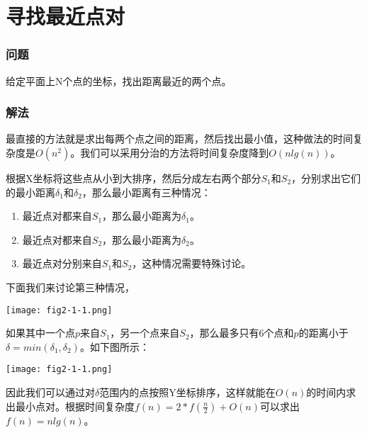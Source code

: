 \section{寻找最近点对} %
\label{sec:closest-pair-of-points}

\subsubsection{问题}
给定平面上N个点的坐标，找出距离最近的两个点。

\subsubsection{解法}
最直接的方法就是求出每两个点之间的距离，然后找出最小值，这种做法的时间复杂度是$O(n^2)$。我们可以采用分治的方法将时间复杂度降到$O(nlg(n))$。

根据X坐标将这些点从小到大排序，然后分成左右两个部分$S_1$和$S_2$，分别求出它们的最小距离$\delta_1$和$\delta_2$，那么最小距离有三种情况：
\begin{enumerate}
	\item 最近点对都来自$S_1$，那么最小距离为$\delta_1$。
	\item 最近点对都来自$S_2$，那么最小距离为$\delta_2$。
	\item 最近点对分别来自$S_1$和$S_2$，这种情况需要特殊讨论。
\end{enumerate}
下面我们来讨论第三种情况，
\begin{center}
	\texttt{[image: fig2-1-1.png]}\\
	\label{fig:closest-pair-of-points-1}
\end{center}
如果其中一个点$p$来自$S_1$，另一个点来自$S_2$，那么最多只有6个点和$p$的距离小于$\delta = min(\delta_1, \delta_2)$。如下图所示：
\begin{center}
	\texttt{[image: fig2-1-1.png]}\\
	\label{fig:closest-pair-of-points-2}
\end{center}
因此我们可以通过对$\delta$范围内的点按照Y坐标排序，这样就能在$O(n)$的时间内求出最小点对。根据时间复杂度$f(n)=2*f(\frac{n}{2})+O(n)$可以求出$f(n)=nlg(n)$。

